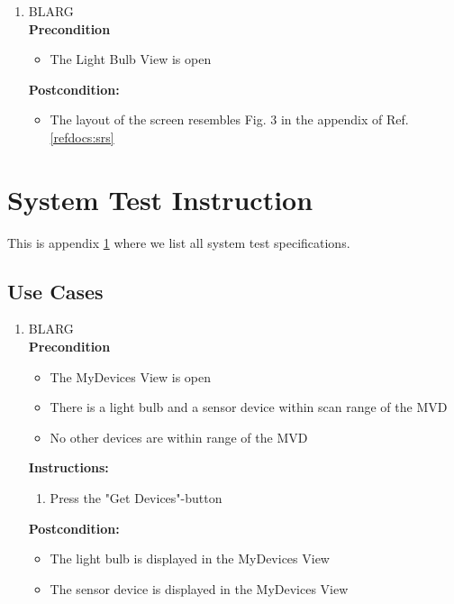 \documentclass[a4paper]{article}
\newlength{\testlabellength}
\newenvironment{testlist}{\begin{enumerate}[label=\bfseries Instruction \thesubsection.\arabic* , labelindent=0pt, labelwidth=\testlabellength , leftmargin=2cm]}{\end{enumerate}}
\newenvironment{precondition}{
{\color{white}BLARG}\\ 
\textbf{Precondition}
\begin{itemize}[labelindent=0cm, labelwidth=2cm , leftmargin=1cm]
}
{\end{itemize}}
\newenvironment{instruction}{
\textbf{Instructions:}
\begin{enumerate}[label=\bfseries  \arabic*., labelindent=0cm, labelwidth=2cm , leftmargin=1cm]
}
{\end{enumerate}}
\newenvironment{postcondition}{
\textbf{Postcondition:}
\begin{itemize}[labelindent=0cm, labelwidth=2cm , leftmargin=1cm]
}
{\end{itemize}}
\begin{document}
\begin{appendices}
\begin{testlist}
	\item
		\begin{precondition}
			\item The Light Bulb View is open
		\end{precondition}
		\begin{postcondition}
			\item The layout of the screen resembles Fig. 3 in the appendix of Ref. \ref{refdocs:srs}
		\end{postcondition}

\end{testlist}	

\newpage

\section{System Test Instruction} \label{appendix:section:systemtest}
This is appendix \ref{appendix:section:systemtest} where we list all system test specifications.

\subsection{Use Cases}
\begin{testlist}
	\item 
		\begin{precondition}
			\item The MyDevices View is open
			\item There is a light bulb and a sensor device within scan range of the MVD
			\item No other devices are within range of the MVD
		\end{precondition}
		\begin{instruction}
			\item Press the "Get Devices"-button
		\end{instruction}
		\begin{postcondition}
			\item The light bulb is displayed in the MyDevices View
		 	\item The sensor device is displayed in the MyDevices View
		\end{postcondition}


\end{testlist}
\end{appendices}
\end{document}
